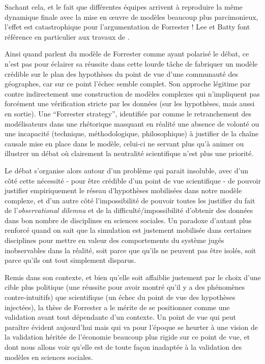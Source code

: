 Sachant cela, et le fait que différentes équipes arrivent à reproduire la même dynamique finale avec la mise en œuvre de modèles beaucoup plus parcimonieux, l'effet est catastrophique pour l'argumentation de Forrester ! Lee  et Batty font référence en particulier aux travaux de \autocite{Stonebraker1972}.

Ainsi quand \textcite{Batty2001} parlent du modèle de Forrester comme ayant polarisé le débat, ce n'est pas pour éclairer sa réussite dans cette lourde tâche de fabriquer un modèle crédible sur le plan des hypothèses du point de vue d'une communauté des géographes, car sur ce point l'échec semble complet. Son approche légitime par contre indirectement une construction de modèles complexes qui n'impliquent pas forcément une vérification stricte par les données (sur les hypothèses, mais aussi en sortie). Une \foreignquote{english}{Forrester strategy}, identifiée par \textcite[7-8]{Batty2001} comme le retranchement des modélisateurs dans une rhétorique masquant en réalité une absence de volonté ou une incapacité (technique, méthodologique, philosophique) à justifier de la chaîne causale mise en place dans le modèle, celui-ci ne servant plus qu'à animer ou illustrer un débat où clairement la neutralité scientifique n'est plus une priorité.

Le débat s'organise alors autour d'un problème qui parait insoluble, avec d'un côté cette nécessité - pour être crédible d'un point de vue scientifique - de pouvoir justifier empiriquement le réseau d'hypothèses mobilisées dans notre modèle complexe, et d'un autre côté l'impossibilité de pouvoir toutes les justifier du fait de l'\textit{observational dilemna} et de la difficulté/impossibilité d'obtenir des données dans bon nombre de disciplines en sciences sociales. Un paradoxe d'autant plus renforcé quand on sait que la simulation est justement mobilisée dans certaines disciplines pour mettre en valeur des comportements du système jugés inobservables dans la réalité, soit parce que qu'ils ne peuvent pas être isolés, soit parce qu'ils ont tout simplement disparus.

Remis dans son contexte, et bien qu'elle soit affaiblie justement par le choix d'une cible plus politique (une réussite pour avoir montré qu'il y a des phénomènes contre-intuitifs) que scientifique (un échec du point de vue des hypothèses injectées), la thèse de Forrester a le mérite de se positionner comme une validation avant tout dépendante d'un contexte. Un point de vue qui peut paraître évident aujourd'hui mais qui va pour l'époque se heurter à une vision de la validation héritée de l'économie beaucoup plus rigide sur ce point de vue, et dont nous allons voir qu'elle est de toute façon inadaptée à la validation des modèles en sciences sociales.


